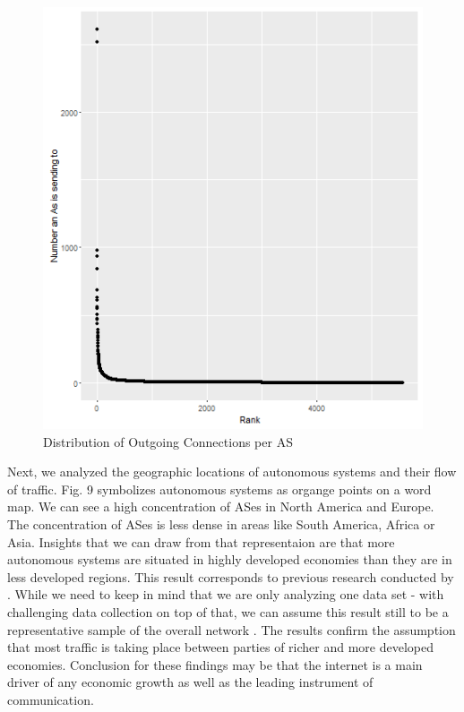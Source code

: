 \documentclass[conference, 11pt]{IEEEtran}
\begin{document}
\vspace{0.5cm}
\begin{figure}[htbp]
\centerline{\includegraphics[scale=0.4]{Graphics/AsFromDistribution.png}}
\caption{Distribution of Outgoing Connections per AS}
\label{fig}
\end{figure}
\vspace{0.5cm}


Next, we analyzed the geographic locations of autonomous systems and their flow of traffic. Fig. 9 symbolizes autonomous systems as organge points on a word map. We can see a high concentration of ASes in North America and Europe. The concentration of ASes is less dense in areas like South America, Africa or Asia. Insights that we can draw from that representaion are that more autonomous systems are situated in highly developed economies  than they are in less developed regions. This result corresponds to previous research conducted by \cite{ResearchGeo}. While we need to keep in mind that we are only analyzing one data set - with challenging data collection on top of that, we can assume this result still to be a representative sample of the overall network \cite{CaidaDataCollection}. The results confirm the assumption that most traffic is taking place between parties of richer and more developed economies. Conclusion for these findings may be that the internet is a main driver of any economic growth as well as the leading instrument of communication.
\end{document}
